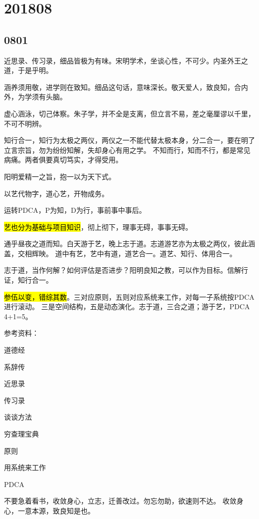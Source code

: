 \section{201808}

\subsection{0801}

近思录、传习录，细品皆极为有味。宋明学术，坐谈心性，不可少。内圣外王之道，于是乎明。

涵养须用敬，进学则在致知。细品这句话，意味深长。敬天爱人，致良知，合内外，为学须有头脑。

虚心涵泳，切己体察。朱子学，并不全是支离，但立言不易，差之毫厘谬以千里，不可不明辨。

知行合一，知行为太极之两仪，两仪之一不能代替太极本身，分二合一，要在明了立言宗旨，勿为纷纷知解，失却身心有用之学。
不知而行，知而不行，都是常见病痛。两者俱要真切笃实，才得受用。

阳明爱精一之旨，抱一以为天下式。

以艺代物字，道心艺，开物成务。

运转PDCA，P为知，D为行，事前事中事后。

\hl{艺也分为基础与项目知识}，彻上彻下，理事无碍，事事无碍。

通乎昼夜之道而知。白天游于艺，晚上志于道。志道游艺亦为太极之两仪，彼此涵盖，交相辉映。
道中有艺，艺中有道，道艺合一。道艺、知行、体用合一。

志于道，当作何解？如何评估是否进步？阳明良知之教，可以作为目标。信解行证，知行合一。

\hl{参伍以变，错综其数}。三对应原则，五则对应系统来工作，对每一子系统按PDCA进行滚动。
三是空间结构，五是动态演化。志于道，三合之道；游于艺，PDCA 4+1=5。

参考资料：
\begin{enumbox}
\item 道德经
\item 系辞传
\item 近思录
\item 传习录
\item 谈谈方法
\item 穷查理宝典
\item 原则
\item 用系统来工作
\item PDCA
\end{enumbox}

不要急着看书，收敛身心，立志，迁善改过。勿忘勿助，欲速则不达。
收敛身心，一意本源，致良知是也。

